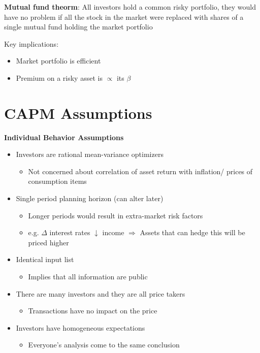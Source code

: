 \documentclass[]{book}
\providecommand{\tightlist}{%
  \setlength{\itemsep}{0pt}\setlength{\parskip}{0pt}}
\theoremstyle{definition}
\theoremstyle{definition}
\theoremstyle{remark}
\begin{document}
\textbf{Mutual fund theorm}: All investors hold a common risky
portfolio, they would have no problem if all the stock in the market
were replaced with shares of a single mutual fund holding the market
portfolio

Key implications:

\begin{itemize}
\item
  Market portfolio is efficient
\item
  Premium on a risky asset is \(\propto\) its \(\beta\)
\end{itemize}

\section{CAPM Assumptions}\label{capm-assumptions}

 \textbf{Individual Behavior Assumptions}

\begin{itemize}
\item
  Investors are rational mean-variance optimizers

  \begin{itemize}
  \tightlist
  \item
    Not concerned about correlation of asset return with inflation/
    prices of consumption items
  \end{itemize}
\item
  Single period planning horizon (can alter later)

  \begin{itemize}
  \item
    Longer periods would result in extra-market risk factors
  \item
    e.g. \(\Delta\) interest rates \(\downarrow\) income \(\Rightarrow\)
    Assets that can hedge this will be priced higher
  \end{itemize}
\item
  Identical input list

  \begin{itemize}
  \tightlist
  \item
    Implies that all information are public
  \end{itemize}
\item
  There are many investors and they are all price takers

  \begin{itemize}
  \tightlist
  \item
    Transactions have no impact on the price
  \end{itemize}
\item
  Investors have homogeneous expectations

  \begin{itemize}
  \tightlist
  \item
    Everyone's analysis come to the same conclusion
  \end{itemize}
\end{itemize}
\end{document}
